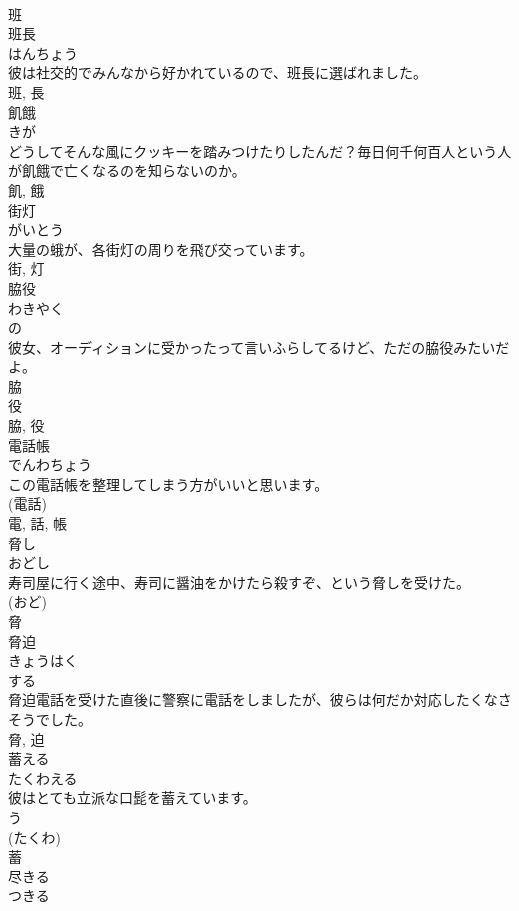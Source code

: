 \documentclass[8pt]{extreport}
\begin{document}
\begin{CJK}{UTF8}{min}
\\	班	
\\	班長	
\\	はんちょう	
\\	彼は社交的でみんなから好かれているので、班長に選ばれました。	
\\	班, 長	
\\	飢餓	
\\	きが	
\\	どうしてそんな風にクッキーを踏みつけたりしたんだ？毎日何千何百人という人が飢餓で亡くなるのを知らないのか。	
\\	飢, 餓	
\\	街灯	
\\	がいとう	
\\	大量の蛾が、各街灯の周りを飛び交っています。	
\\	街, 灯	
\\	脇役	
\\	わきやく	
\\	の 
\\	彼女、オーディションに受かったって言いふらしてるけど、ただの脇役みたいだよ。	
\\	脇
\\	役
\\	脇, 役	
\\	電話帳	
\\	でんわちょう	
\\	この電話帳を整理してしまう方がいいと思います。	
\\	(電話) 
\\	電, 話, 帳	
\\	脅し	
\\	おどし	
\\	寿司屋に行く途中、寿司に醤油をかけたら殺すぞ、という脅しを受けた。	
\\	(おど) 
\\	脅	
\\	脅迫	
\\	きょうはく	
\\	する 
\\	脅迫電話を受けた直後に警察に電話をしましたが、彼らは何だか対応したくなさそうでした。	
\\	脅, 迫	
\\	蓄える	
\\	たくわえる	
\\	彼はとても立派な口髭を蓄えています。	
\\	う 
\\	(たくわ) 
\\	蓄	
\\	尽きる	
\\	つきる	

\end{CJK}
\end{document}
